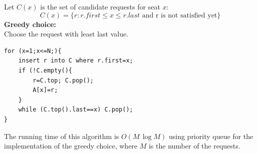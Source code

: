 Let $C(x)$ is the set of candidate requests for seat $x$:
$$C(x)=\{ r: r.first \leq x \leq r.last \textrm{ and r is not satisfied yet} \} $$
\noindent\textbf{Greedy choice:}\\
Choose the request with least last value.
\begin{lstlisting}
for (x=1;x<=N;){
    insert r into C where r.first=x;
    if (!C.empty(){
        r=C.top; C.pop();
        A[x]=r;
    }
    while (C.top().last==x) C.pop();
}
\end{lstlisting}
The running time of this algorithm is $O(M \, \log M)$ using priority queue for the implementation of the greedy choice, where $M$ is the number of the requests.


